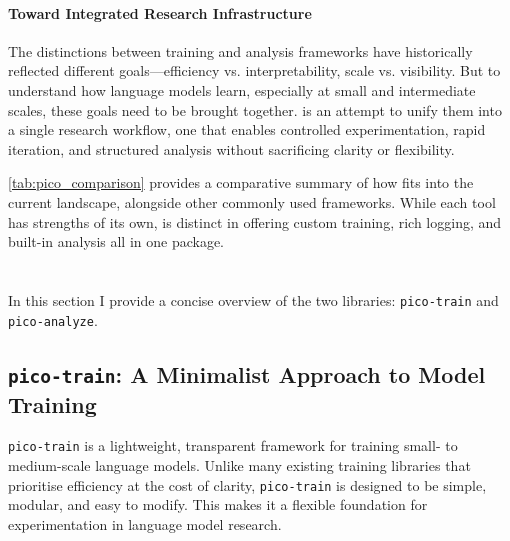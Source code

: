 
\paragraph{Toward Integrated Research Infrastructure}
The distinctions between training and analysis frameworks have historically reflected different goals—efficiency vs. interpretability, scale vs. visibility. But to understand how language models learn, especially at small and intermediate scales, these goals need to be brought together. \pico is an attempt to unify them into a single research workflow, one that enables controlled experimentation, rapid iteration, and structured analysis without sacrificing clarity or flexibility.

\cref{tab:pico_comparison} provides a comparative summary of how \pico fits into the current landscape, alongside other commonly used frameworks. While each tool has strengths of its own, \pico is distinct in offering custom training, rich logging, and built-in analysis all in one package.

\section[\picomed]{\picolarge}

In this section I provide a concise overview of the two \pico libraries: \texttt{pico-train} and \texttt{pico-analyze}. 

\subsection{\texttt{pico-train}: A Minimalist Approach to Model Training}

\texttt{pico-train} is a lightweight, transparent framework for training small- to medium-scale language models. Unlike many existing training libraries that prioritise efficiency at the cost of clarity, \texttt{pico-train} is designed to be simple, modular, and easy to modify. This makes it a flexible foundation for experimentation in language model research.


